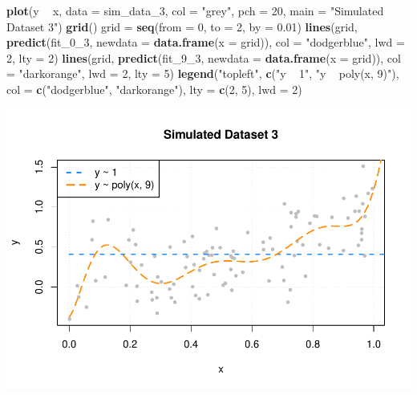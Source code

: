 \documentclass[]{report}
\newenvironment{Shaded}{\begin{snugshade}}{\end{snugshade}}
\newcommand{\KeywordTok}[1]{\textcolor[rgb]{0.13,0.29,0.53}{\textbf{#1}}}
\newcommand{\DataTypeTok}[1]{\textcolor[rgb]{0.13,0.29,0.53}{#1}}
\newcommand{\DecValTok}[1]{\textcolor[rgb]{0.00,0.00,0.81}{#1}}
\newcommand{\FloatTok}[1]{\textcolor[rgb]{0.00,0.00,0.81}{#1}}
\newcommand{\StringTok}[1]{\textcolor[rgb]{0.31,0.60,0.02}{#1}}
\newcommand{\OperatorTok}[1]{\textcolor[rgb]{0.81,0.36,0.00}{\textbf{#1}}}
\newcommand{\NormalTok}[1]{#1}
\begin{document}
\begin{Shaded}
\begin{Highlighting}[]
\KeywordTok{plot}\NormalTok{(y }\OperatorTok{~}\StringTok{ }\NormalTok{x, }\DataTypeTok{data =}\NormalTok{ sim_data_}\DecValTok{3}\NormalTok{, }\DataTypeTok{col =} \StringTok{"grey"}\NormalTok{, }\DataTypeTok{pch =} \DecValTok{20}\NormalTok{, }\DataTypeTok{main =} \StringTok{"Simulated Dataset 3"}\NormalTok{)}
\KeywordTok{grid}\NormalTok{()}
\NormalTok{grid =}\StringTok{ }\KeywordTok{seq}\NormalTok{(}\DataTypeTok{from =} \DecValTok{0}\NormalTok{, }\DataTypeTok{to =} \DecValTok{2}\NormalTok{, }\DataTypeTok{by =} \FloatTok{0.01}\NormalTok{)}
\KeywordTok{lines}\NormalTok{(grid, }\KeywordTok{predict}\NormalTok{(fit_0_}\DecValTok{3}\NormalTok{, }\DataTypeTok{newdata =} \KeywordTok{data.frame}\NormalTok{(}\DataTypeTok{x =}\NormalTok{ grid)), }\DataTypeTok{col =} \StringTok{"dodgerblue"}\NormalTok{, }\DataTypeTok{lwd =} \DecValTok{2}\NormalTok{, }\DataTypeTok{lty =} \DecValTok{2}\NormalTok{)}
\KeywordTok{lines}\NormalTok{(grid, }\KeywordTok{predict}\NormalTok{(fit_9_}\DecValTok{3}\NormalTok{, }\DataTypeTok{newdata =} \KeywordTok{data.frame}\NormalTok{(}\DataTypeTok{x =}\NormalTok{ grid)), }\DataTypeTok{col =} \StringTok{"darkorange"}\NormalTok{, }\DataTypeTok{lwd =} \DecValTok{2}\NormalTok{, }\DataTypeTok{lty =} \DecValTok{5}\NormalTok{)}
\KeywordTok{legend}\NormalTok{(}\StringTok{"topleft"}\NormalTok{, }\KeywordTok{c}\NormalTok{(}\StringTok{"y ~ 1"}\NormalTok{, }\StringTok{"y ~ poly(x, 9)"}\NormalTok{), }\DataTypeTok{col =} \KeywordTok{c}\NormalTok{(}\StringTok{"dodgerblue"}\NormalTok{, }\StringTok{"darkorange"}\NormalTok{), }\DataTypeTok{lty =} \KeywordTok{c}\NormalTok{(}\DecValTok{2}\NormalTok{, }\DecValTok{5}\NormalTok{), }\DataTypeTok{lwd =} \DecValTok{2}\NormalTok{)}
\end{Highlighting}
\end{Shaded}

\includegraphics{MyBook_files/figure-latex/unnamed-chunk-110-1.pdf}
\end{document}
